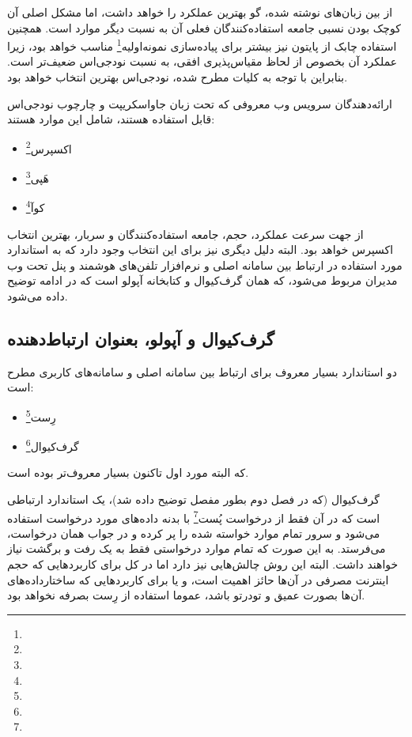 \newpage

از بین زبان‌های نوشته شده، گو بهترین عملکرد را خواهد داشت، اما مشکل اصلی آن کوچک بودن نسبی جامعه استفاده‌کنندگان فعلی آن به نسبت دیگر موارد است. همچنین استفاده چابک از پایتون نیز بیشتر برای پیاده‌سازی نمونه‌اولیه\footnote{} مناسب خواهد بود، زیرا عملکرد آن بخصوص از لحاظ مقیاس‌پذیری افقی، به نسبت نودجی‌اس ضعیف‌تر است. بنابراین با توجه به کلیات مطرح شده، نودجی‌اس بهترین انتخاب خواهد بود.

ارائه‌دهندگان سرویس وب معروفی که تحت زبان جاواسکریپت و چارچوب نودجی‌اس قابل استفاده هستند، شامل این موارد هستند:
\begin{itemize}
	\item اکسپرس\footnote{}
	\item هَپی\footnote{}
	\item کوآ\footnote{}
\end{itemize}

از جهت سرعت عملکرد، حجم، جامعه استفاده‌کنندگان و سربار، بهترین انتخاب اکسپرس خواهد بود. البته دلیل دیگری نیز برای این انتخاب وجود دارد که به استاندارد مورد استفاده در ارتباط بین سامانه اصلی و نرم‌افزار تلفن‌های هوشمند و پنل تحت وب مدیران مربوط می‌شود، که همان گرف‌کیوال و کتابخانه آپولو است که در ادامه توضیح داده می‌شود.\cite{express}

\subsection{گرف‌کیوال و آپولو، بعنوان ارتباط‌دهنده}

دو استاندارد بسیار معروف برای ارتباط بین سامانه اصلی و سامانه‌های کاربری مطرح است:

\begin{itemize}
	\item رِست\footnote{}
	\item گرف‌کیوال\footnote{}
\end{itemize}

که البته مورد اول تاکنون بسیار معروف‌تر بوده است.

گرف‌کیوال (که در فصل دوم بطور مفصل توضیح داده شد)، یک استاندارد ارتباطی است که در آن فقط از درخواست پُست\footnote{} با بدنه داده‌های مورد درخواست استفاده می‌شود و سرور تمام موارد خواسته شده را پر کرده و در جواب همان درخواست، می‌فرستد. به این صورت که تمام موارد درخواستی فقط به یک رفت و برگشت نیاز خواهند داشت. البته این روش چالش‌هایی نیز دارد اما در کل برای کاربردهایی که حجم اینترنت مصرفی در آن‌ها حائز اهمیت است، و یا برای کاربردهایی که ساختارداده‌های آن‌ها بصورت عمیق و تودرتو باشد، عموما استفاده از رِست بصرفه نخواهد بود.

